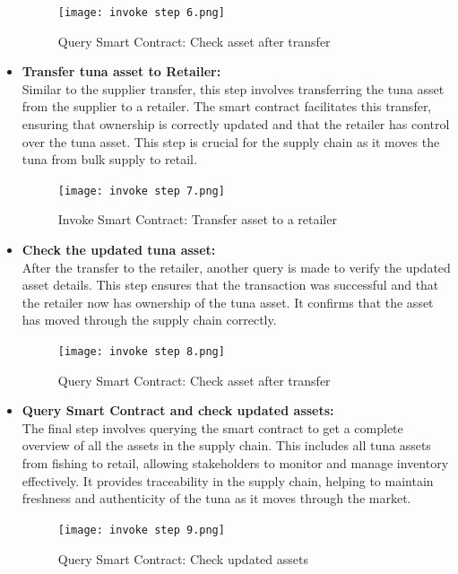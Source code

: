 \begin{itemize}
	\begin{figure}[H]
		\centering
		\texttt{[image: invoke step 6.png]}
		\caption{Query Smart Contract: Check asset after transfer}
		\label{fig: sixth step}
	\end{figure}
	
	\item \textbf{Transfer tuna asset to Retailer:}\\
	Similar to the supplier transfer, this step involves transferring the tuna asset from the supplier to a retailer. The smart contract facilitates this transfer, ensuring that ownership is correctly updated and that the retailer has control over the tuna asset. This step is crucial for the supply chain as it moves the tuna from bulk supply to retail.
	
	\begin{figure}[H]
		\centering
		\texttt{[image: invoke step 7.png]}
		\caption{Invoke Smart Contract: Transfer asset to a retailer}
		\label{fig: seventh step}
	\end{figure}
	
	\item \textbf{Check the updated tuna asset:}\\
	After the transfer to the retailer, another query is made to verify the updated asset details. This step ensures that the transaction was successful and that the retailer now has ownership of the tuna asset. It confirms that the asset has moved through the supply chain correctly.
	
	\begin{figure}[H]
		\centering
		\texttt{[image: invoke step 8.png]}
		\caption{Query Smart Contract: Check asset after transfer}
		\label{fig: eight step}
	\end{figure}
	
	\item \textbf{Query Smart Contract and check updated assets:}\\
	The final step involves querying the smart contract to get a complete overview of all the assets in the supply chain. This includes all tuna assets from fishing to retail, allowing stakeholders to monitor and manage inventory effectively. It provides traceability in the supply chain, helping to maintain freshness and authenticity of the tuna as it moves through the market.
	
	\begin{figure}[H]
		\centering
		\texttt{[image: invoke step 9.png]}
		\caption{Query Smart Contract: Check updated assets}
		\label{fig: ninth step}
	\end{figure}
	
	
\end{itemize}
